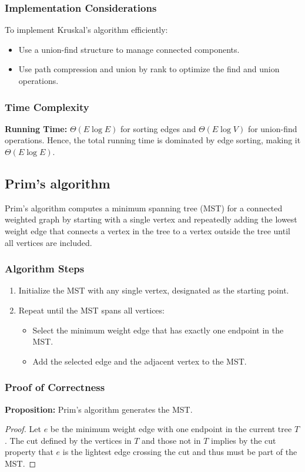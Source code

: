 \documentclass{article}
\begin{document}
\subsubsection{Implementation Considerations}
To implement Kruskal's algorithm efficiently:
\begin{itemize}
  \item Use a union-find structure to manage connected components.
  \item Use path compression and union by rank to optimize the find and union operations.
\end{itemize}

\subsubsection{Time Complexity}
\textbf{Running Time:} $\Theta(E \log E)$ for sorting edges and $\Theta(E \log V)$ for union-find operations. Hence, the total running time is dominated by edge sorting, making it $\Theta(E \log E)$.

\subsection{Prim's algorithm}

Prim's algorithm computes a minimum spanning tree (MST) for a connected weighted graph by starting with a single vertex and repeatedly adding the lowest weight edge that connects a vertex in the tree to a vertex outside the tree until all vertices are included.

\subsubsection{Algorithm Steps}
\begin{enumerate}
  \item Initialize the MST with any single vertex, designated as the starting point.
  \item Repeat until the MST spans all vertices:
  \begin{itemize}
    \item Select the minimum weight edge that has exactly one endpoint in the MST.
    \item Add the selected edge and the adjacent vertex to the MST.
  \end{itemize}
\end{enumerate}

\subsubsection{Proof of Correctness}
\textbf{Proposition:} Prim's algorithm generates the MST.
\begin{proof}
Let $e$ be the minimum weight edge with one endpoint in the current tree $T$. The cut defined by the vertices in $T$ and those not in $T$ implies by the cut property that $e$ is the lightest edge crossing the cut and thus must be part of the MST.
\end{proof}
\end{document}
